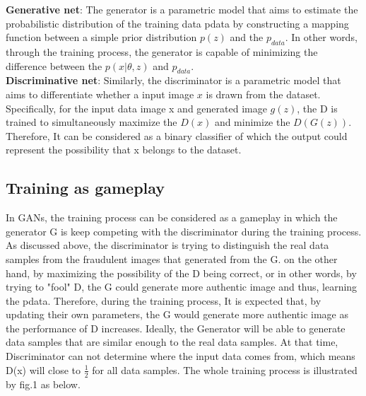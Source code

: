 \documentclass[10pt,twocolumn,letterpaper]{article}
\begin{document}
\textbf{Generative net}: 
The generator is a parametric model that aims to estimate the probabilistic distribution of the training data pdata by constructing a mapping function between a simple prior distribution $p(z)$  and the $p_{data}$. In other words, through the training process, the generator is capable of minimizing the difference between the $p(x|\theta,z)$ and $p_{data}$.\\ 

\textbf{Discriminative net}:
Similarly, the discriminator is a parametric model that aims to differentiate whether a input image $x$ is drawn from the dataset. Specifically, for the input data image x and generated image $g(z)$, the D is trained to simultaneously maximize the $D(x)$ and minimize the  $D(G(z))$. Therefore, It can be considered as a binary classifier of which the output could represent the possibility that x belongs to the dataset.   


\subsection{Training as gameplay}

In GANs, the training process can be considered as a gameplay in which the generator G is keep competing with the discriminator during the training process. As discussed above, the discriminator is trying to distinguish the real data samples from the fraudulent images that generated from the G. on the other hand, by maximizing the possibility of the D being correct, or in other words, by trying to "fool" D, the G could generate more authentic image and thus, learning the pdata. Therefore, during the training process, It is expected that, by updating their own parameters,  the G would generate more authentic image as the performance of D increases. Ideally, the Generator will be able to generate data samples that are similar enough to the real data samples. At that time, Discriminator can not determine where the input data comes from, which means D(x) will close to $\frac{1}{2}$ for all data samples. The whole training process is illustrated by fig.1 as below. 


\end{document}
